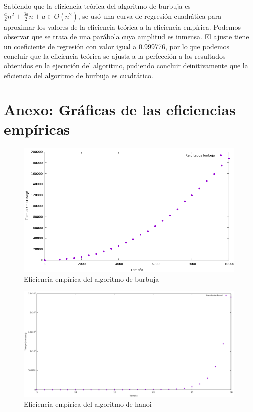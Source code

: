 \documentclass[11pt,twoside,titlepage,a4paper]{article}
\begin{document}
Sabiendo que la eficiencia teórica del algoritmo de burbuja es $\frac a2n^2+\frac{3a}{2}n+a\in O(n^2)$, se 
usó una curva de regresión cuadrática para aproximar los valores de la eficiencia teórica a la eficiencia
empírica. Podemos observar que se trata de una parábola cuya amplitud es inmensa. El ajuste tiene un
coeficiente de regresión con valor igual a 0.999776, por lo que podemos concluir que la eficiencia teórica
se ajusta a la perfección a los resultados obtenidos en la ejecución del algoritmo, pudiendo concluir deinitivamente que la eficiencia del algoritmo de burbuja es cuadrático.
\clearpage

\section{Anexo: Gráficas de las eficiencias empíricas}

\begin{figure}[htp]
\centering
\includegraphics[scale=0.60]{burbuja_empirica.png}
\caption{Eficiencia empírica del algoritmo de burbuja}
\label{Gráfico de la eficiencia empírica del algoritmo de burbuja}
\end{figure}

\begin{figure}[htp]
\centering
\includegraphics[scale=0.40]{hanoi_empirica.png}
\caption{Eficiencia empírica del algoritmo de hanoi}
\label{Gráfico de la eficiencia empírica del algoritmo de hanoi}
\end{figure}
\end{document}
